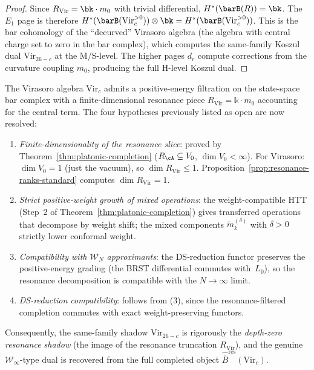 \begin{proof}
Since $R_{\mathrm{Vir}} = \bk \cdot m_0$ with trivial
differential, $H^*(\barB(R)) = \bk$.  The $E_1$ page is
therefore $H^*(\barB(\mathrm{Vir}_c^{>0})) \otimes \bk
= H^*(\barB(\mathrm{Vir}_c^{>0}))$.  This is the
bar cohomology of the ``decurved'' Virasoro algebra (the
algebra with central charge set to zero in the bar complex),
which computes the same-family Koszul dual
$\mathrm{Vir}_{26-c}$ at the M/S-level.  The higher pages
$d_r$ compute corrections from the curvature coupling $m_0$,
producing the full H-level Koszul dual.
\end{proof}

\begin{remark}
\label{rem:virasoro-resonance-model}
The Virasoro algebra $\mathrm{Vir}_c$ admits a
positive-energy filtration on the state-space bar complex
with a finite-dimensional resonance piece
$R_{\mathrm{Vir}} = \mathbb{k} \cdot m_0$ accounting for
the central term.  The four hypotheses previously listed as
open are now resolved:
\begin{enumerate}
\item \emph{Finite-dimensionality of the resonance slice}:
  proved by Theorem~\ref{thm:platonic-completion}
  ($R_\cA \subseteq V_0$, $\dim V_0 < \infty$).
  For Virasoro: $\dim V_0 = 1$ (just the vacuum), so
  $\dim R_{\mathrm{Vir}} \le 1$.
  Proposition~\ref{prop:resonance-ranks-standard} computes
  $\dim R_{\mathrm{Vir}} = 1$.
\item \emph{Strict positive-weight growth of mixed
  operations}: the weight-compatible HTT (Step~2 of
  Theorem~\ref{thm:platonic-completion}) gives transferred
  operations that decompose by weight shift; the mixed
  components $\tilde{m}_k^{(\delta)}$ with $\delta > 0$
  strictly lower conformal weight.
\item \emph{Compatibility with $\mathcal{W}_N$
  approximants}: the DS-reduction functor preserves the
  positive-energy grading (the BRST differential commutes
  with~$L_0$), so the resonance decomposition is compatible
  with the $N \to \infty$ limit.
\item \emph{DS-reduction compatibility}: follows from (3),
  since the resonance-filtered completion commutes with
  exact weight-preserving functors.
\end{enumerate}
Consequently, the same-family shadow $\mathrm{Vir}_{26-c}$
is rigorously the \emph{depth-zero resonance shadow} (the
image of the resonance truncation $R_{\mathrm{Vir}}$),
and the genuine $\mathcal{W}_\infty$-type dual is recovered
from the full completed object
$\widehat{\bar B}^{\mathrm{res}}(\mathrm{Vir}_c)$.
\end{remark}

